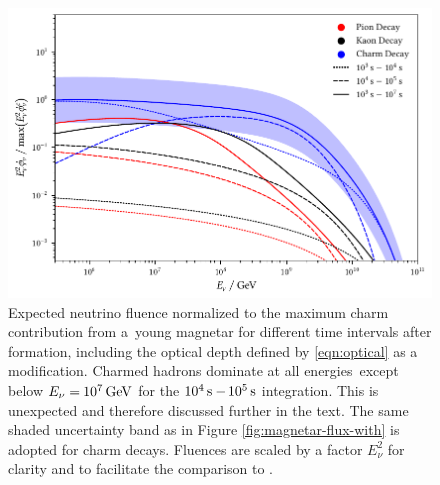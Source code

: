 \begin{figure}[H]
	\centering
	\includegraphics{../plots/build/magnetar_integrated_neutrino_spectrum_with.pdf}
	\caption[Magnetar $\nu \kern+0.5pt$ fluence compared to $c$ decay with optical depth.]
			{Expected neutrino fluence normalized to the maximum charm contribution from a~young magnetar for different time
			 intervals after formation, including the optical depth defined by \eqref{eqn:optical} as a modification.
			 Charmed hadrons dominate at all energies~except below $E_\nu = \kern-0.5pt \qty{e7}{\giga\electronvolt}$ for the
			 $\qty{e4}{\second} - \kern-1.0pt \qty{e5}{\second}$ integration. This is unexpected and therefore discussed further
			 in the text. The same shaded uncertainty band as in Figure \ref{fig:magnetar-flux-with} is adopted for charm decays.
			 Fluences are scaled by a factor $E_\nu^2$ for clarity and to facilitate the comparison to \cite{Carpio_2020}.}
	\label{fig:magnetar-fluence-with}
\end{figure}

